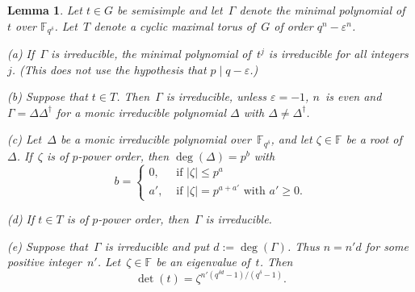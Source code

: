 \documentclass[12pt]{amsart}
\newtheorem{lem}[thm]{Lemma}
\theoremstyle{theorem}
\theoremstyle{definition}
\theoremstyle{remark}
\begin{document}
\begin{lem}
\label{MinimalPolynomialAndDeterminant}
Let $t \in G$ be semisimple and let~$\Gamma$ denote the minimal polynomial 
of~$t$ over $\mathbb{F}_{q^{\delta}}$. Let~$T$ denote a cyclic maximal torus 
of~$G$ of order $q^n - \varepsilon^n$.

{\rm (a)} If~$\Gamma$ is irreducible, the minimal polynomial of~$t^j$ is 
irreducible for all integers~$j$. (This does not use the hypothesis
that $p \mid q - \varepsilon$.)

{\rm (b)} Suppose that $t \in T$. Then~$\Gamma$ is irreducible, unless 
$\varepsilon = -1$, $n$~is even and $\Gamma = \Delta\Delta^{\dagger}$ for a 
monic irreducible polynomial $\Delta$ with $\Delta \neq \Delta^{\dagger}$.

{\rm (c)} Let~$\Delta$ be a monic irreducible polynomial 
over~$\mathbb{F}_{q^{\delta}}$, and let $\zeta \in \mathbb{F}$ be a root 
of~$\Delta$. If~$\zeta$ is of $p$-power order, then
$\deg(\Delta) = p^b$ with
$$
b = \begin{cases} 0, & \text{\ if\ } |\zeta| \leq p^a \\
                    a', & \text{\ if\ } |\zeta| = p^{a + a'} \text{\ with\ } a' \geq 0.
\end{cases}
$$

{\rm (d)} If $t \in T$ is of $p$-power order, then~$\Gamma$ is irreducible.

{\rm (e)} Suppose that~$\Gamma$ is irreducible and put $d := \deg( \Gamma )$.
Thus $n = n' d$ for some positive integer~$n'$. Let~$\zeta \in \mathbb{F}$ be 
an eigenvalue of~$t$. Then
$$\det(t) = \zeta^{n'(q^{\delta d} -1)/(q^{\delta}-1)}.$$
\end{lem}
\end{document}
